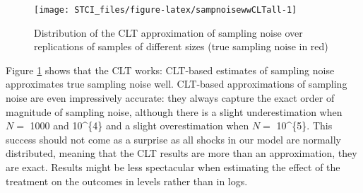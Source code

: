 \documentclass[]{book}
\newenvironment{Shaded}{\begin{snugshade}}{\end{snugshade}}
\newcommand{\KeywordTok}[1]{\textcolor[rgb]{0.13,0.29,0.53}{\textbf{#1}}}
\newcommand{\DataTypeTok}[1]{\textcolor[rgb]{0.13,0.29,0.53}{#1}}
\newcommand{\DecValTok}[1]{\textcolor[rgb]{0.00,0.00,0.81}{#1}}
\newcommand{\StringTok}[1]{\textcolor[rgb]{0.31,0.60,0.02}{#1}}
\newcommand{\ControlFlowTok}[1]{\textcolor[rgb]{0.13,0.29,0.53}{\textbf{#1}}}
\newcommand{\OperatorTok}[1]{\textcolor[rgb]{0.81,0.36,0.00}{\textbf{#1}}}
\newcommand{\NormalTok}[1]{#1}
\theoremstyle{definition}
\theoremstyle{definition}
\theoremstyle{definition}
\theoremstyle{remark}
\begin{document}
\begin{Shaded}
\end{Shaded}

\begin{figure}[htbp]

{\centering \texttt{[image: STCI\_files/figure-latex/sampnoisewwCLTall-1]} 

}

\caption{Distribution of the CLT approximation of sampling noise over replications of samples of different sizes (true sampling noise in red)}\label{fig:sampnoisewwCLTall}
\end{figure}

Figure \ref{fig:sampnoisewwCLTall} shows that the CLT works: CLT-based
estimates of sampling noise approximates true sampling noise well.
CLT-based approximations of sampling noise are even impressively
accurate: they always capture the exact order of magnitude of sampling
noise, although there is a slight underestimation when \(N=\) 1000 and
10\^{}\{4\} and a slight overestimation when \(N=\) 10\^{}\{5\}. This
success should not come as a surprise as all shocks in our model are
normally distributed, meaning that the CLT results are more than an
approximation, they are exact. Results might be less spectacular when
estimating the effect of the treatment on the outcomes in levels rather
than in logs.
\end{document}
